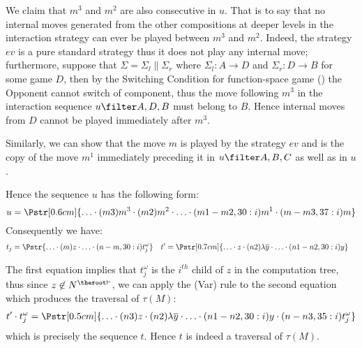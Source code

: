 \begin{enumerate}[$\bullet$]
\begin{enumerate}
\begin{itemize}
\begin{enumerate}[(a)]
        We claim that $m^3$ and $m^2$ are also consecutive in $u$. That is to say that no internal moves generated from the
        other compositions at deeper levels in the interaction strategy can ever be played between $m^3$ and $m^2$. Indeed, the strategy $ev$ is a pure standard strategy thus it does not play any internal move; furthermore, suppose that $\Sigma  = \Sigma_l \| \Sigma_r$ where $\Sigma_l: A\rightarrow D$ and $\Sigma_r: D\rightarrow B$ for some game $D$, then  by the Switching Condition for function-space game (\cite{hylandong_pcf}) the Opponent cannot switch of component, thus the move following $m^3$ in the interaction sequence $u \filter A,D,B$ must belong to $B$. Hence internal moves from $D$ cannot be played immediately after $m^3$.

        Similarly, we can show that the move $m$ is played by the strategy $ev$ and is the copy of the move $m^1$ immediately preceding it in $u\filter A,B,C$ as well as in $u$.

        Hence the sequence $u$ has the following form:
        $$u = \Pstr[0.6cm]{ \ldots \cdot (m3){m^3} \cdot
                    (m2){m^2} \cdot \ldots \cdot
                    (m1-m2,30:i){m^1} \cdot (m-m3,37:i){m} } $$
        Consequently we have:
        \begin{align*}
        t_j &= \Pstr{ \ldots \cdot (m)z \cdot \ldots \cdot (n-m,30:i){t_j^\omega} }  &
        t'&= \Pstr[0.7cm]{ \ldots \cdot z \cdot (n2){\lambda \overline{y}} \cdot \ldots \cdot (n1-n2,30:i){y} }
        \end{align*}

        The first equation implies that $t_j^\omega$ is the $i^{th}$ child of $z$ in the computation tree,
        thus since $z\not\in N^{\theroot\vdash}$, we can apply the (Var) rule to the second equation which produces the traversal of $\tau(M)$:
        \begin{eqnarray*}
            t' \cdot t_j^\omega = \Pstr[0.5cm]{ \ldots \cdot (n3){z} \cdot (n2){\lambda \overline{y}} \cdot \ldots \cdot (n1-n2,30:i){y} \cdot (n-n3,35:i){t_j^\omega} }
        \end{eqnarray*}
        which is precisely the sequence $t$. Hence $t$ is indeed a traversal of $\tau(M)$.


\end{enumerate}
\end{itemize}
\end{enumerate}
\end{enumerate}
